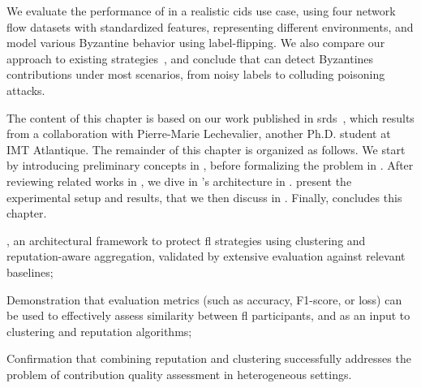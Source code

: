 We evaluate the performance of \thecontrib in a realistic \gls{cids} use case, using four network flow datasets with standardized features, representing different environments, and model various Byzantine behavior using label-flipping.
We also compare our approach to existing strategies~\cite{mcmahan_Communicationefficientlearningdeep_2017,fung_LimitationsFederatedLearning_2020}, and conclude that \thecontrib can detect Byzantines contributions under most scenarios, from noisy labels to colluding poisoning attacks. 

The content of this chapter is based on our work published in \gls{srds}~\cite{lavaur_radar_2024}, which results from a collaboration with Pierre-Marie Lechevalier, another Ph.D. student at IMT Atlantique.
The remainder of this chapter is organized as follows.
We start by introducing preliminary concepts in , before formalizing the problem in .
After reviewing related works in , we dive in \thecontrib's architecture in .
 present the experimental setup and results, that we then discuss in .
Finally,  concludes this chapter.

\begin{contribs}
  \item \thecontrib, an architectural framework to protect \gls{fl} strategies using clustering and reputation-aware aggregation, validated by extensive evaluation against relevant baselines;
  \item Demonstration that evaluation metrics (such as accuracy, F1-score, or loss) can be used to effectively assess similarity between \gls{fl} participants, and as an input to clustering and reputation algorithms;
  \item Confirmation that combining reputation and clustering successfully addresses the problem of contribution quality assessment in heterogeneous settings.
\end{contribs}
